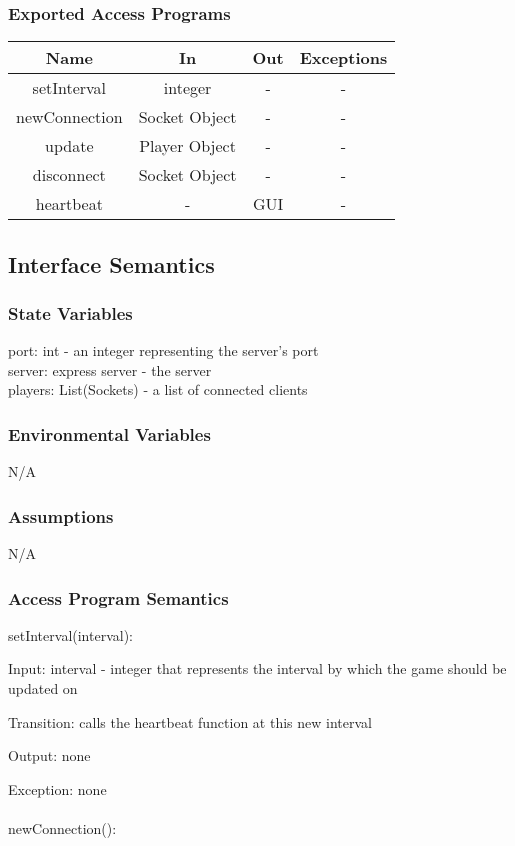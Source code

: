 \documentclass[12,english]{article}
\begin{document}
		\subsubsection{Exported Access Programs}
		
	\begin{tabular}[pos]{|c|c|c|c|}
	\hline
	\textbf{Name}& \textbf{In} & \textbf{Out} & \textbf{Exceptions} \\ 
	\hline
	setInterval & integer & -  & -\\ \hline
	newConnection & Socket Object & -  & -\\ \hline
	update & Player Object & -  & -\\ \hline
	disconnect & Socket Object & -  & -\\ \hline
	heartbeat & - & GUI  & -\\ \hline
	\end{tabular}		
	\label{ServerEAP}	
	\subsection{Interface Semantics}
		\subsubsection{State Variables}
		port: int - an integer representing the server's port\\
		server: express server - the server\\
		players: List(Sockets) - a list of connected clients
		
		\subsubsection{Environmental Variables}
		N/A
		\subsubsection{Assumptions}
        N/A
		\subsubsection{Access Program Semantics}
		setInterval(interval):

		Input: interval - integer that represents the interval by which the game should be updated on
		
		Transition: calls the heartbeat function at this new interval
		
		Output: none
		
		Exception: none\\
		\\
		newConnection():
\end{document}
